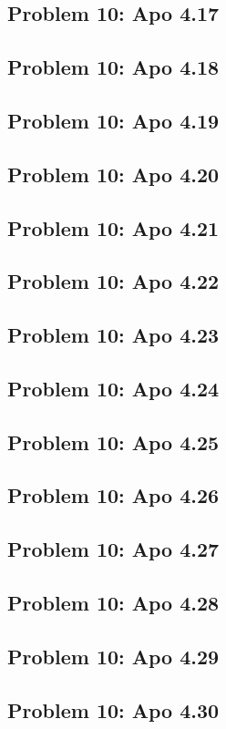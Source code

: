 \subsection[Problem 17]{Problem 10: Apo 4.17}

\subsection[Problem 18]{Problem 10: Apo 4.18}

\subsection[Problem 19]{Problem 10: Apo 4.19}

\subsection[Problem 20]{Problem 10: Apo 4.20}

\subsection[Problem 21]{Problem 10: Apo 4.21}

\subsection[Problem 22]{Problem 10: Apo 4.22}

\subsection[Problem 23]{Problem 10: Apo 4.23}

\subsection[Problem 24]{Problem 10: Apo 4.24}

\subsection[Problem 25]{Problem 10: Apo 4.25}

\subsection[Problem 26]{Problem 10: Apo 4.26}

\subsection[Problem 27]{Problem 10: Apo 4.27}

\subsection[Problem 28]{Problem 10: Apo 4.28}

\subsection[Problem 29]{Problem 10: Apo 4.29}

\subsection[Problem 30]{Problem 10: Apo 4.30}

